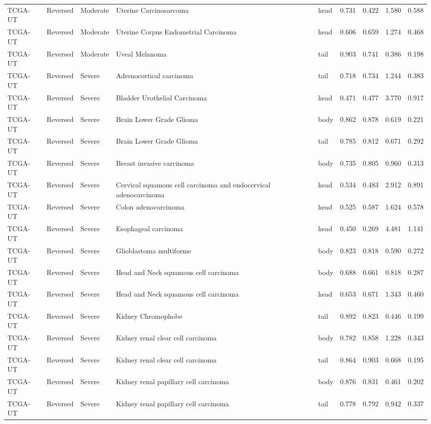 \begin{longtable}{lllllrrrr}
TCGA-UT & Reversed & Moderate & Uterine Carcinosarcoma & head & 0.731 & 0.422 & 1.580 & 0.588 \\
TCGA-UT & Reversed & Moderate & Uterine Corpus Endometrial Carcinoma & head & 0.606 & 0.659 & 1.274 & 0.468 \\
TCGA-UT & Reversed & Moderate & Uveal Melanoma & tail & 0.903 & 0.741 & 0.386 & 0.198 \\
TCGA-UT & Reversed & Severe & Adrenocortical carcinoma & tail & 0.718 & 0.734 & 1.244 & 0.383 \\
TCGA-UT & Reversed & Severe & Bladder Urothelial Carcinoma & head & 0.471 & 0.477 & 3.770 & 0.917 \\
TCGA-UT & Reversed & Severe & Brain Lower Grade Glioma & body & 0.862 & 0.878 & 0.619 & 0.221 \\
TCGA-UT & Reversed & Severe & Brain Lower Grade Glioma & tail & 0.785 & 0.812 & 0.671 & 0.292 \\
TCGA-UT & Reversed & Severe & Breast invasive carcinoma & body & 0.735 & 0.805 & 0.960 & 0.313 \\
TCGA-UT & Reversed & Severe & Cervical squamous cell carcinoma and endocervical adenocarcinoma & head & 0.534 & 0.483 & 2.912 & 0.891 \\
TCGA-UT & Reversed & Severe & Colon adenocarcinoma & head & 0.525 & 0.587 & 1.624 & 0.578 \\
TCGA-UT & Reversed & Severe & Esophageal carcinoma & head & 0.450 & 0.269 & 4.481 & 1.141 \\
TCGA-UT & Reversed & Severe & Glioblastoma multiforme & body & 0.823 & 0.818 & 0.590 & 0.272 \\
TCGA-UT & Reversed & Severe & Head and Neck squamous cell carcinoma & body & 0.688 & 0.661 & 0.818 & 0.287 \\
TCGA-UT & Reversed & Severe & Head and Neck squamous cell carcinoma & head & 0.653 & 0.671 & 1.343 & 0.460 \\
TCGA-UT & Reversed & Severe & Kidney Chromophobe & tail & 0.892 & 0.823 & 0.446 & 0.199 \\
TCGA-UT & Reversed & Severe & Kidney renal clear cell carcinoma & body & 0.782 & 0.858 & 1.228 & 0.343 \\
TCGA-UT & Reversed & Severe & Kidney renal clear cell carcinoma & tail & 0.864 & 0.903 & 0.668 & 0.195 \\
TCGA-UT & Reversed & Severe & Kidney renal papillary cell carcinoma & body & 0.876 & 0.831 & 0.461 & 0.202 \\
TCGA-UT & Reversed & Severe & Kidney renal papillary cell carcinoma & tail & 0.778 & 0.792 & 0.942 & 0.337 \\

\end{longtable}
